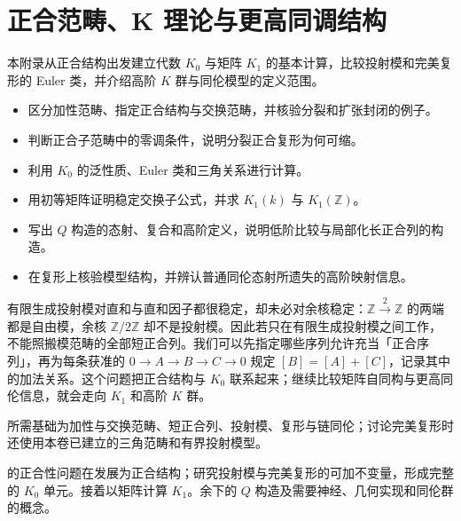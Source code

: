 
\chapter{正合范畴、K 理论与更高同调结构}
\label{b4:app:B}

\begin{chapterabstract}
	本附录从正合结构出发建立代数 \(K_0\) 与矩阵 \(K_1\) 的基本计算，比较投射模和完美复形的 Euler 类，并介绍高阶 \(K\) 群与同伦模型的定义范围。
\end{chapterabstract}

\begin{learninggoals}
	\begin{itemize}
		\item 区分加性范畴、指定正合结构与交换范畴，并核验分裂和扩张封闭的例子。
		\item 判断正合子范畴中的零调条件，说明分裂正合复形为何可缩。
		\item 利用 \(K_0\) 的泛性质、Euler 类和三角关系进行计算。
		\item 用初等矩阵证明稳定交换子公式，并求 \(K_1(k)\) 与 \(K_1(\mathbb Z)\)。
		\item 写出 \(Q\) 构造的态射、复合和高阶定义，说明低阶比较与局部化长正合列的构造。
		\item 在复形上核验模型结构，并辨认普通同伦态射所遗失的高阶映射信息。
	\end{itemize}
\end{learninggoals}

有限生成投射模对直和与直和因子都很稳定，却未必对余核稳定：\(\mathbb Z\xrightarrow{2}\mathbb Z\) 的两端都是自由模，余核 \(\mathbb Z/2\mathbb Z\) 却不是投射模。因此若只在有限生成投射模之间工作，不能照搬模范畴的全部短正合列。我们可以先指定哪些序列允许充当「正合序列」，再为每条获准的 \(0\rightarrow A\rightarrow B\rightarrow C\rightarrow0\) 规定 \([B]=[A]+[C]\)，记录其中的加法关系。这个问题把正合结构与 \(K_0\) 联系起来；继续比较矩阵自同构与更高同伦信息，就会走向 \(K_1\) 和高阶 \(K\) 群。

\ProseParagraphBreak
所需基础为加性与交换范畴、短正合列、投射模、复形与链同伦；讨论完美复形时还使用本卷已建立的三角范畴和有界投射模型。

\ProseParagraphBreak
{}的正合性问题在发展为正合结构；研究投射模与完美复形的可加不变量，形成完整的 \(K_0\) 单元。接着以矩阵计算 \(K_1\)。余下的 \(Q\) 构造及需要神经、几何实现和同伦群的概念。

